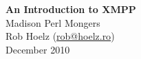 \begin{titlepage}
\vspace*{\fill}
\begin{center}
{\huge \bfseries An Introduction to XMPP} \\[0.5cm]
{\LARGE Madison Perl Mongers} \\[0.5cm]
{\large Rob Hoelz (\href{mailto:rob@hoelz.ro}{rob@hoelz.ro})} \\[0.5cm]
{\large December 2010}
\end{center}
\vspace*{\fill}
\end{titlepage}
